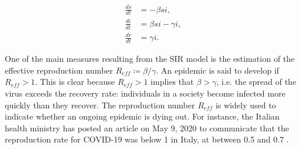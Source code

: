 \documentclass[12pt]{article}
\begin{document}
	\begin{align}
    	\frac{ds}{dt} &= -\beta si, \label{eq:SIR_model_S_prop}\\
    	\frac{di}{dt} &= \beta si - \gamma i, \label{eq:SIR_model_I_prop}\\
    	\frac{dr}{dt} &= \gamma i. \label{eq:SIR_model_R_prop}
	\end{align}
	
	One of the main measures resulting from the SIR model is the estimation of the effective reproduction number $R_{eff} \coloneqq \beta / \gamma$. An epidemic is said to develop if $R_{eff} > 1$. This is clear because $R_{eff} > 1$ implies that $\beta > \gamma$, i.e. the spread of the virus exceeds the recovery rate: individuals in a society become infected more quickly than they recover. The reproduction number $R_{eff}$ is widely used to indicate whether an ongoing epidemic is dying out. For instance, the Italian health ministry has posted an article on May 9, 2020 to communicate that the reproduction rate for COVID-19 was below 1 in Italy, at between 0.5 and 0.7 \parencite{saluteR0}.
	
	
\end{document}
